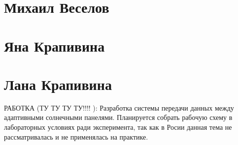 \documentclass{article}
\begin{document}
\section*{Михаил Веселов}

\section*{Яна Крапивина}

\section*{Лана Крапивина}
РАБОТКА (ТУ ТУ ТУ ТУ!!!! ): Разработка системы передачи данных между адаптивными солнечными панелями. Планируется собрать рабочую схему в лабораторных условиях ради эксперимента, так как в Росии данная тема не рассматривалась и не применялась на практике.
\end{document}
